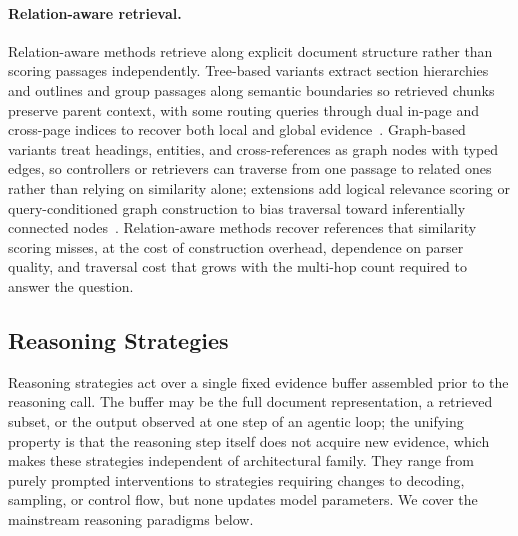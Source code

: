 \paragraph{Relation-aware retrieval.} Relation-aware methods retrieve along explicit document structure rather than scoring passages independently. Tree-based variants extract section hierarchies and outlines and group passages along semantic boundaries so retrieved chunks preserve parent context, with some routing queries through dual in-page and cross-page indices to recover both local and global evidence~\cite{shin2026multidocfusion, sun2025docagent, gong2026mhier}. Graph-based variants treat headings, entities, and cross-references as graph nodes with typed edges, so controllers or retrievers can traverse from one passage to related ones rather than relying on similarity alone; extensions add logical relevance scoring or query-conditioned graph construction to bias traversal toward inferentially connected nodes~\cite{wang2024knowledge, wu2025molorag, zhang2026mldocrag}. Relation-aware methods recover references that similarity scoring misses, at the cost of construction overhead, dependence on parser quality, and traversal cost that grows with the multi-hop count required to answer the question.

\subsection{Reasoning Strategies}
\label{sec:tf-reasoning}
Reasoning strategies act over a single fixed evidence buffer assembled prior to the reasoning call. The buffer may be the full document representation, a retrieved subset, or the output observed at one step of an agentic loop; the unifying property is that the reasoning step itself does not acquire new evidence, which makes these strategies independent of architectural family. They range from purely prompted interventions to strategies requiring changes to decoding, sampling, or control flow, but none updates model parameters. We cover the mainstream reasoning paradigms below.

